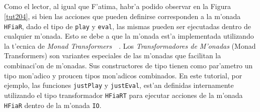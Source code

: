 \documentclass[a4paper]{article}
\begin{document}
\subparagraph{}Como el lector, al igual que F'atima, habr'a podido observar en la Figura \ref{tut204}, si bien las acciones que pueden definirse corresponden a la m'onada \texttt{HFiaR}, dado el tipo de \texttt{play} y \texttt{eval}, las mismas pueden ser ejecutadas dentro de cualquier m'onada.  Esto se debe a que la m'onada est'a implementada utilizando la t'ecnica de \textsl{Monad Transformers}~\cite{realworldhaskell}~\cite{mtl}.  Los \textsl{Transformadores de M'onadas} (Monad Transformers) son variantes especiales de las m'onadas que facilitan la combinaci'on de m'onadas.  Sus constructores de tipo tienen como par'ametro un tipo mon'adico y proucen tipos mon'adicos combinados.  En este tutorial, por ejemplo, las funciones \texttt{justPlay} y \texttt{justEval}, est'an definidas internamente utilizando el tipo transformador \texttt{HFiaRT} para ejecutar acciones de la m'onada \texttt{HFiaR} dentro de la m'onada \texttt{IO}.
\end{document}
